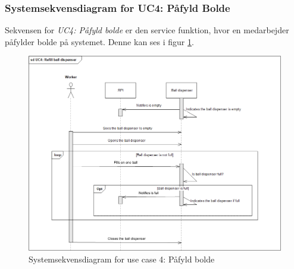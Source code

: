 \documentclass[Rapport/Rapport_main.tex]{subfiles}
\begin{document}
\subsubsection{Systemsekvensdiagram for UC4: Påfyld Bolde}
Sekvensen for \textit{UC4: Påfyld bolde} er den service funktion, hvor en medarbejder påfylder bolde på systemet. Denne kan ses i figur \ref{fig:rap_sd_UC4}.
\begin{figure}[H]
    \centering
    \includegraphics[width=\textwidth]{Arkitektur/Sekvensdiagrammer/graphics/sd_UC4.png}
    \caption{Systemsekvensdiagram for use case 4: Påfyld bolde}
    \label{fig:rap_sd_UC4}
\end{figure}
\end{document}
